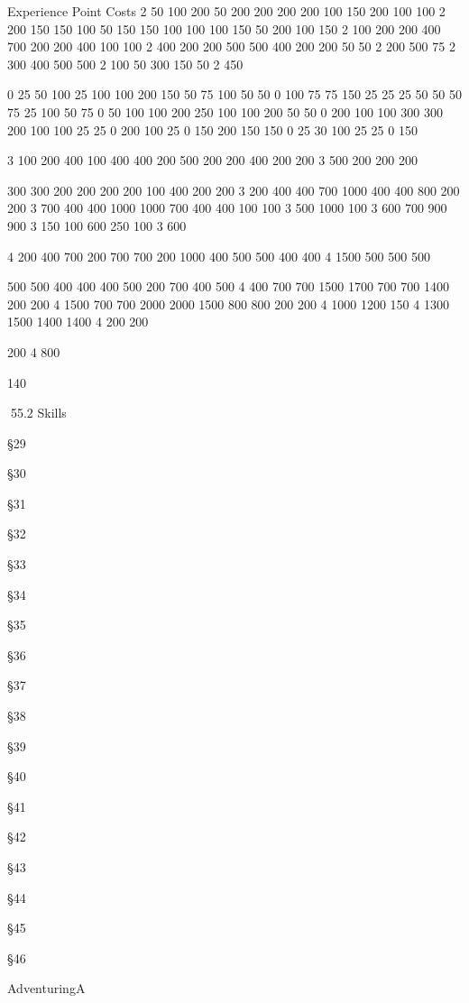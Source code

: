\begin{Chapter}{Experience Point Costs}
2 
50 
100 
200 
50 
200 
200 
200 
200 
100 
150 
200 
100 
100 
2 
200 
150 
150 
100 
50 
150 
150 
100 
100 
100 
150 
50 
200 
100 
150 
2 
100 
200 
200 
400 
700 
200 
200 
400 
100 
100 
2 
400 
200 
200 
500 
500 
400 
200 
200 
50 
50 
2 
200 
500 
75 
2 
300 
400 
500 
500 
2 
100 
50 
300 
150 
50 
2 
450 

0 
25 
50 
100 
25 
100 
100 
200 
150 
50 
75 
100 
50 
50 
0 
100 
75 
75 
150 
25 
25 
25 
50 
50 
50 
75 
25 
100 
50 
75 
0 
50 
100 
100 
200 
250 
100 
100 
200 
50 
50 
0 
200 
100 
100 
300 
300 
200 
100 
100 
25 
25 
0 
200 
100 
25 
0 
150 
200 
150 
150 
0 
25 
30 
100 
25 
25 
0 
150 

 

3 
100 
200 
400 
100 
400 
400 
200 
500 
200 
200 
400 
200 
200 
3 
500 
200 
200 
200 
  
300 
300 
200 
200 
200 
200 
100 
400 
200 
200 
3 
200 
400 
400 
700 
1000 
400 
400 
800 
200 
200 
3 
700 
400 
400 
1000 
1000 
700 
400 
400 
100 
100 
3 
500 
1000 
100 
3 
600 
700 
900 
900 
3 
150 
100 
600 
250 
100 
3 
600 

4 
200 
400 
700 
200 
700 
700 
200 
1000 
400 
500 
500 
400 
400 
4 
1500 
500 
500 
500 
  
500 
500 
400 
400 
400 
500 
200 
700 
400 
500 
4 
400 
700 
700 
1500 
1700 
700 
700 
1400 
200 
200 
4 
1500 
700 
700 
2000 
2000 
1500 
800 
800 
200 
200 
4 
1000 
1200 
150 
4 
1300 
1500 
1400 
1400 
4 
200 
200 
 
  
200 
4 
800 

140 

55.2 Skills 

 
§29 

§30 

§31 

§32 

§33 

§34 

§35 

§36 

§37 

§38 

§39 

§40 

§41 

§42 

§43 

§44 

§45 

§46 

 
AdventuringA 


\end{Chapter}
